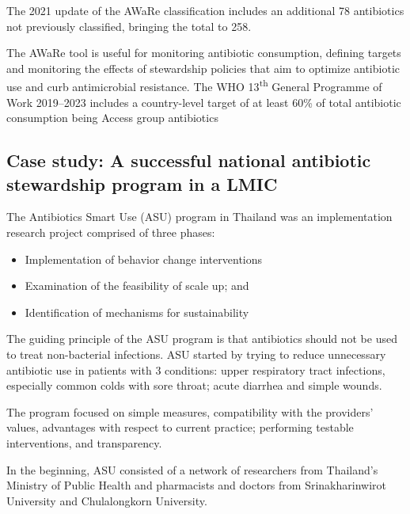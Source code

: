 \documentclass[
]{book}
\providecommand{\tightlist}{%
  \setlength{\itemsep}{0pt}\setlength{\parskip}{0pt}}
\begin{document}
The 2021 update of the AWaRe classification includes an additional 78 antibiotics not previously classified, bringing the total to 258.

The AWaRe tool is useful for monitoring antibiotic consumption, defining targets and monitoring the effects of stewardship policies that aim to optimize antibiotic use and curb antimicrobial resistance. The WHO 13\textsuperscript{th} General Programme of Work 2019--2023 includes a country-level target of at least 60\% of total antibiotic consumption being Access group antibiotics

\hypertarget{case-study-a-successful-national-antibiotic-stewardship-program-in-a-lmic}{%
\subsection*{Case study: A successful national antibiotic stewardship program in a LMIC}\label{case-study-a-successful-national-antibiotic-stewardship-program-in-a-lmic}}

The Antibiotics Smart Use (ASU) program in Thailand was an implementation research project comprised of three phases:

\begin{itemize}
\tightlist
\item
  Implementation of behavior change interventions
\item
  Examination of the feasibility of scale up; and
\item
  Identification of mechanisms for sustainability
\end{itemize}

The guiding principle of the ASU program is that antibiotics should not be used to treat non-bacterial infections. ASU started by trying to reduce unnecessary antibiotic use in patients with 3 conditions: upper respiratory tract infections, especially common colds with sore throat; acute diarrhea and simple wounds.

The program focused on simple measures, compatibility with the providers' values, advantages with respect to current practice; performing testable interventions, and transparency.

In the beginning, ASU consisted of a network of researchers from Thailand's Ministry of Public Health and pharmacists and doctors from Srinakharinwirot University and Chulalongkorn University.
\end{document}
